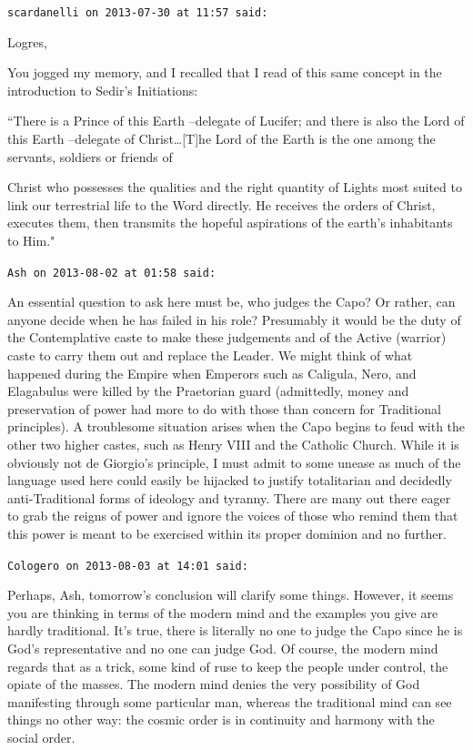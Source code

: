 \begin{footnotesize}
\begin{sffamily}
\hfill

\texttt{scardanelli on 2013-07-30 at 11:57 said: }

Logres,

You jogged my memory, and I recalled that I read of this same concept in the introduction to Sedir's Initiations:

``There is a Prince of this Earth –delegate of Lucifer; and there is also the Lord of this Earth –delegate of Christ…[T]he Lord of the Earth is the one among the servants, soldiers or friends of

Christ who possesses the qualities and the right quantity of Lights most suited to link our terrestrial life to the Word directly. He receives the orders of Christ, executes them, then transmits the hopeful aspirations of the earth's inhabitants to Him."


\hfill

\texttt{Ash on 2013-08-02 at 01:58 said: }

An essential question to ask here must be, who judges the Capo? Or rather, can anyone decide when he has failed in his role? Presumably it would be the duty of the Contemplative caste to make these judgements and of the Active (warrior) caste to carry them out and replace the Leader. We might think of what happened during the Empire when Emperors such as Caligula, Nero, and Elagabulus were killed by the Praetorian guard (admittedly, money and preservation of power had more to do with those than concern for Traditional principles). A troublesome situation arises when the Capo begins to feud with the other two higher castes, such as Henry VIII and the Catholic Church. While it is obviously not de Giorgio's principle, I must admit to some unease as much of the language used here could easily be hijacked to justify totalitarian and decidedly anti-Traditional forms of ideology and tyranny. There are many out there eager to grab the reigns of power and ignore the voices of those who remind them that this power is meant to be exercised within its proper dominion and no further.


\hfill

\texttt{Cologero on 2013-08-03 at 14:01 said: }

Perhaps, Ash, tomorrow's conclusion will clarify some things. However, it seems you are thinking in terms of the modern mind and the examples you give are hardly traditional. It's true, there is literally no one to judge the Capo since he is God's representative and no one can judge God. Of course, the modern mind regards that as a trick, some kind of ruse to keep the people under control, the opiate of the masses. The modern mind denies the very possibility of God manifesting through some particular man, whereas the traditional mind can see things no other way: the cosmic order is in continuity and harmony with the social order.


\end{sffamily}
\end{footnotesize}
